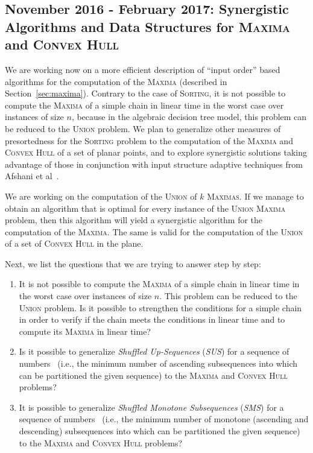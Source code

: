 \subsection{November 2016 - February 2017: Synergistic Algorithms and
  Data Structures for \textsc{Maxima} and \textsc{Convex Hull}}

We are working now on a more efficient description of ``input order''
based algorithms for the computation of the \textsc{Maxima} (described
in Section~\ref{sec:maxima}). Contrary to the case of
\textsc{Sorting}, it is not possible to compute the \textsc{Maxima} of
a simple chain in linear time in the worst case over instances of size
$n$, because in the algebraic decision tree model, this problem can be
reduced to the \textsc{Union} problem. We plan to generalize other
measures of presortedness for the \textsc{Sorting} problem to the
computation of the \textsc{Maxima} and \textsc{Convex Hull} of a set
of planar points, and to explore synergistic solutions taking
advantage of those in conjunction with input structure adaptive
techniques from Afshani et
al~\cite{2009-FOCS-InstanceOptimalGeometricAlgorithms-AfshaniBarbayChan}.

We are working on the computation of the \textsc{Union} of $k$
\textsc{Maximas}. If we manage to obtain an algorithm that is optimal
for every instance of the \textsc{Union Maxima} problem, then this
algorithm will yield a synergistic algorithm for the computation of
the \textsc{Maxima}. The same is valid for the computation of the
\textsc{Union} of a set of \textsc{Convex Hull} in the plane.

\begin{INUTILE}
  Next, we list the questions that we are trying to answer step by
  step:

  \begin{enumerate}
  \item It is not possible to compute the \textsc{Maxima} of a simple
    chain in linear time in the worst case over instances of size
    $n$. This problem can be reduced to the \textsc{Union} problem. Is
    it possible to strengthen the conditions for a simple chain in
    order to verify if the chain meets the conditions in linear time
    and to compute its \textsc{Maxima} in linear time?
  \item Is it possible to generalize \emph{Shuffled Up-Sequences}
    (\emph{SUS}) for a sequence of
    numbers~\cite{1990-SWAT-SortingShuffledMonotoneSequences-LevcopoulosPetersson}
    (i.e., the minimum number of ascending subsequences into which can
    be partitioned the given sequence) to the \textsc{Maxima} and
    \textsc{Convex Hull} problems?
  \item It is possible to generalize \emph{Shuffled Monotone
      Subsequences} (\emph{SMS}) for a sequence of
    numbers~\cite{1990-SWAT-SortingShuffledMonotoneSequences-LevcopoulosPetersson}
    (i.e., the minimum number of monotone (ascending and descending)
    subsequences into which can be partitioned the given sequence) to
    the \textsc{Maxima} and \textsc{Convex Hull} problems?
  \end{enumerate}
\end{INUTILE}


